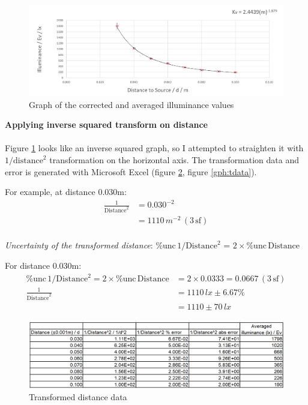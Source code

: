 \documentclass[a4paper,12pt]{article}
\newcommand{\relun}{\% \text{unc}\,}
\newcommand{\tsf}{\,\text{sf}}
\newcommand{\paragraphnl}[1]{\textbf{#1}\\\\}
\begin{document}
\begin{figure}[H]
    \centering
    \includegraphics[width=\textwidth]{assets/averagegraph.png}
    \caption{Graph of the corrected and averaged illuminance values}
    \label{gph:average}
\end{figure}


\paragraphnl{Applying inverse squared transform on distance}
Figure \ref{gph:average} looks like an inverse squared graph, so I attempted to straighten it with $1/{\text{distance}}^2$ transformation on the horizontal axis. The transformation data and error is generated with Microsoft Excel (figure \ref{fig:tdata}, figure \ref{gph:tdata}).

For example, at distance 0.030m:
\begin{align*}
 \frac{1}{\text{Distance}^2} &= 0.030 ^ {-2}\\
 &= 1110\,\si{m^{-2}}\, (3 \tsf)\\
\end{align*}

\textit{Uncertainty of the transformed distance}: $\relun 1/{\text{Distance}}^2$ = $2 \times \relun \text{Distance}$

For distance 0.030m:
\begin{align*}
 \relun 1/{\text{Distance}}^2 = 2 \times \relun \text{Distance} &= 2 \times 0.0333 = 0.0667 \,(3 \tsf)\\
 \frac{1}{\text{Distance}^2} &= 1110\, \si{lx} \pm 6.67\%\\
 &= 1110 \pm 70 \,\si{lx}
\end{align*}


\begin{figure}[H]
    \centering
    \includegraphics[width=\textwidth]{assets/transformdata.png}
    \caption{Transformed distance data}
    \label{fig:tdata}
\end{figure}
\end{document}
